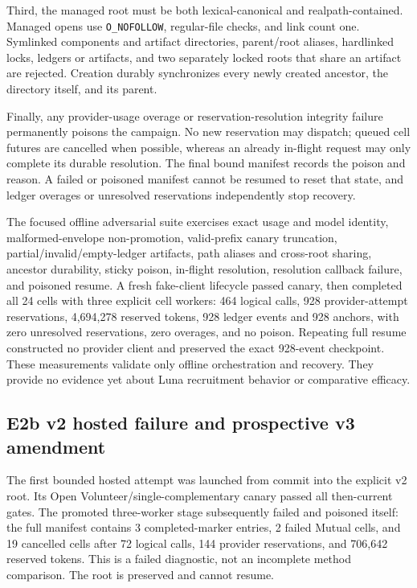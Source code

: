\documentclass[11pt]{article}
\newcommand{\code}[1]{\texttt{#1}}
\newcommand{\hash}[1]{{\ttfamily\footnotesize\seqsplit{#1}}}
\begin{document}
Third, the managed root must be both lexical-canonical and realpath-contained.
Managed opens use \code{O\_NOFOLLOW}, regular-file checks, and link count one.
Symlinked components and artifact directories, parent/root aliases,
hardlinked locks, ledgers or artifacts, and two separately locked roots that
share an artifact are rejected.  Creation durably synchronizes every newly
created ancestor, the directory itself, and its parent.

Finally, any provider-usage overage or reservation-resolution integrity
failure permanently poisons the campaign.  No new reservation may dispatch;
queued cell futures are cancelled when possible, whereas an already in-flight
request may only complete its durable resolution.  The final bound manifest
records the poison and reason.  A failed or poisoned manifest cannot be
resumed to reset that state, and ledger overages or unresolved reservations
independently stop recovery.

The focused offline adversarial suite exercises exact usage and model
identity, malformed-envelope non-promotion, valid-prefix canary truncation,
partial/invalid/empty-ledger artifacts, path aliases and cross-root sharing,
ancestor durability, sticky poison, in-flight resolution, resolution callback
failure, and poisoned resume.  A fresh fake-client lifecycle passed canary,
then completed all 24 cells with three explicit cell workers: 464 logical
calls, 928 provider-attempt reservations, 4,694,278 reserved tokens, 928
ledger events and 928 anchors, with zero unresolved reservations, zero
overages, and no poison.  Repeating full resume constructed no provider client
and preserved the exact 928-event checkpoint.  These measurements validate
only offline orchestration and recovery.  They provide no evidence yet about
Luna recruitment behavior or comparative efficacy.

\subsection{E2b v2 hosted failure and prospective v3 amendment}

The first bounded hosted attempt was launched from commit
\hash{345da487a0217776b89b655e693dadcbfb153807} into the explicit v2 root.
Its Open Volunteer/single-complementary canary passed all then-current gates.
The promoted three-worker stage subsequently failed and poisoned itself:
the full manifest contains 3 completed-marker entries, 2 failed Mutual cells,
and 19 cancelled cells after 72 logical calls, 144 provider reservations, and
706,642 reserved tokens.  This is a failed diagnostic, not an incomplete
method comparison.  The root is preserved and cannot resume.
\end{document}
